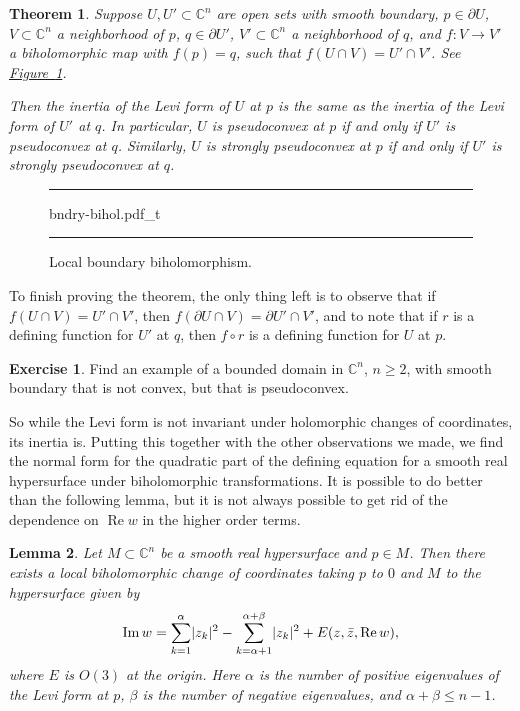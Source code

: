 \documentclass[12pt,openany]{book}
\newcommand{\avoidbreak}{\postdisplaypenalty=100}
\renewcommand{\Re}{\operatorname{Re}}
\renewcommand{\Im}{\operatorname{Im}}
\newcommand{\sabs}[1]{\lvert {#1} \rvert}
\newcommand{\C}{{\mathbb{C}}}
\theoremstyle{plain}
\newtheorem{thm}{Theorem}[section]
\newtheorem{lemma}[thm]{Lemma}
\theoremstyle{remark}
\theoremstyle{definition}
\newenvironment{exbox}{%
    \def\FrameCommand{\vrule width 1pt \relax\hspace{10pt}}%
    \MakeFramed{\advance\hsize-\width\FrameRestore}%
}{%
    \endMakeFramed
}
\newenvironment{myfig}{%
\begin{figure}[h!t]
\noindent\rule{\textwidth}{0.5pt}\vspace{12pt}\par\centering}%
{\par\noindent\rule{\textwidth}{0.5pt}
\end{figure}}
\theoremstyle{exercise}
\newtheorem{exercise}{Exercise}[section]
\theoremstyle{example}
\newcommand{\figureref}[1]{\hyperref[#1]{Figure~\ref*{#1}}}
\begin{document}
\begin{thm}
\pagebreak[2]
Suppose $U, U' \subset \C^n$ are open sets with smooth boundary,
$p \in \partial U$, $V \subset \C^n$ a neighborhood of $p$,
$q \in \partial U'$, $V' \subset \C^n$ a neighborhood of $q$,
and $f \colon V \to V'$ a biholomorphic map with $f(p) = q$, such that
$f(U \cap V) = U' \cap V'$.
See \figureref{fig:bndry-bihol}.

Then the inertia of the Levi form of $U$ at $p$ is the same as the inertia of
the Levi form of $U'$ at $q$.
In particular, $U$ is pseudoconvex at $p$ if and only if $U'$ is pseudoconvex at $q$.
Similarly,
$U$ is strongly pseudoconvex at $p$ if and only if $U'$ is strongly pseudoconvex at $q$.
\end{thm}

\begin{myfig}
{bndry-bihol.pdf_t}
\caption{Local boundary biholomorphism.\label{fig:bndry-bihol}}
\end{myfig}

To finish proving the theorem, the only thing left is to observe that if
$f(U \cap V) = U' \cap V'$, then $f(\partial U \cap V) = \partial U' \cap
V'$, and to note that if $r$ is a defining function for $U'$ at $q$,
then $f \circ r$ is a defining function for $U$ at $p$.

\begin{exbox}
\begin{exercise}
Find an example of a bounded domain in $\C^n$, $n \geq 2$, with smooth boundary that is not convex,
but that is pseudoconvex.
\end{exercise}
\end{exbox}

So while the Levi form is not invariant under holomorphic changes of coordinates,
its inertia is.
Putting this together with the other observations we made,
we find the normal form for the
quadratic part of the defining equation for a smooth real hypersurface
under biholomorphic transformations.
It is possible to do better than the following lemma, but it is not always possible
to get rid of the dependence on $\Re w$ in the higher order terms.

\begin{lemma} \label{lemma:normformquad}
Let $M \subset \C^n$ be a smooth real hypersurface and $p \in M$.  Then there
exists a local biholomorphic change of coordinates taking $p$ to $0$
and $M$ to the hypersurface given by
\begin{equation*}
\Im w = \sum_{k=1}^\alpha \sabs{z_k}^2 - \sum_{k=\alpha+1}^{\alpha+\beta}
\sabs{z_k}^2 +
E(z,\bar{z},\Re w) ,
\avoidbreak
\end{equation*}
where $E$ is $O(3)$ at the origin.
Here $\alpha$ is the number of positive eigenvalues of the Levi form at $p$,
$\beta$ is the number of negative eigenvalues, and $\alpha+\beta \leq n-1$.
\end{lemma}
\end{document}
